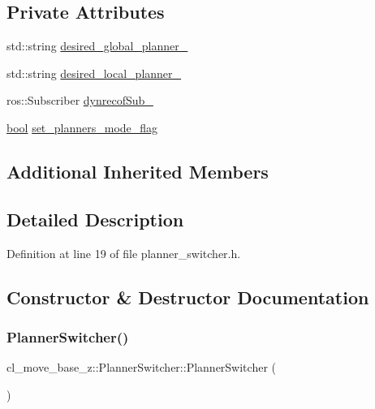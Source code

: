 \subsection*{Private Attributes}
\begin{DoxyCompactItemize}
\item 
std\+::string \hyperlink{classcl__move__base__z_1_1PlannerSwitcher_aef047d3778b2993c1df146bbad43e03d}{desired\+\_\+global\+\_\+planner\+\_\+}
\item 
std\+::string \hyperlink{classcl__move__base__z_1_1PlannerSwitcher_a6cbf65f11bb69125f913caaabdf7b4cf}{desired\+\_\+local\+\_\+planner\+\_\+}
\item 
ros\+::\+Subscriber \hyperlink{classcl__move__base__z_1_1PlannerSwitcher_ae902346f4f8e58241acc56cccaad8546}{dynrecof\+Sub\+\_\+}
\item 
\hyperlink{classbool}{bool} \hyperlink{classcl__move__base__z_1_1PlannerSwitcher_a6c14fd001513787ed213704e2d3dc383}{set\+\_\+planners\+\_\+mode\+\_\+flag}
\end{DoxyCompactItemize}
\subsection*{Additional Inherited Members}


\subsection{Detailed Description}


Definition at line 19 of file planner\+\_\+switcher.\+h.



\subsection{Constructor \& Destructor Documentation}
\mbox{\label{classcl__move__base__z_1_1PlannerSwitcher_aacdf8266ba7dc861efd460645587561f}} 
\subsubsection{\texorpdfstring{Planner\+Switcher()}{PlannerSwitcher()}}
{\footnotesize\ttfamily cl\+\_\+move\+\_\+base\+\_\+z\+::\+Planner\+Switcher\+::\+Planner\+Switcher (\begin{DoxyParamCaption}{ }\end{DoxyParamCaption})}



